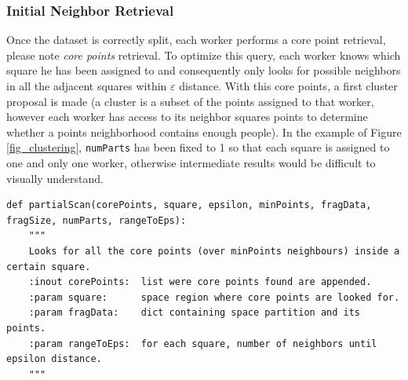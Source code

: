 \documentclass[10pt,journal,compsoc]{IEEEtran}
\begin{document}
\subsubsection*{Initial Neighbor Retrieval} \label{neigh_retr} 
Once the dataset is correctly split, each worker performs a core point retrieval, please note \emph{core points} retrieval. To optimize this query, each worker knows which square he has been assigned to and consequently only looks for possible neighbors in all the adjacent squares within $\varepsilon$ distance. With this core points, a first cluster proposal is made (a cluster is a subset of the points assigned to that worker, however each worker has access to its neighbor squares points to determine whether a points neighborhood contains enough people). In the example of Figure \ref{fig_clustering}, \texttt{numParts} has been fixed to 1 so that each square is assigned to one and only one worker, otherwise intermediate results would be difficult to visually understand.
\begin{lstlisting}
def partialScan(corePoints, square, epsilon, minPoints, fragData, fragSize, numParts, rangeToEps):
    """
    Looks for all the core points (over minPoints neighbours) inside a certain square.
    :inout corePoints:  list were core points found are appended.
    :param square:      space region where core points are looked for.
    :param fragData:    dict containing space partition and its points.
    :param rangeToEps:  for each square, number of neighbors until epsilon distance. 
    """
\end{lstlisting}
\end{document}
